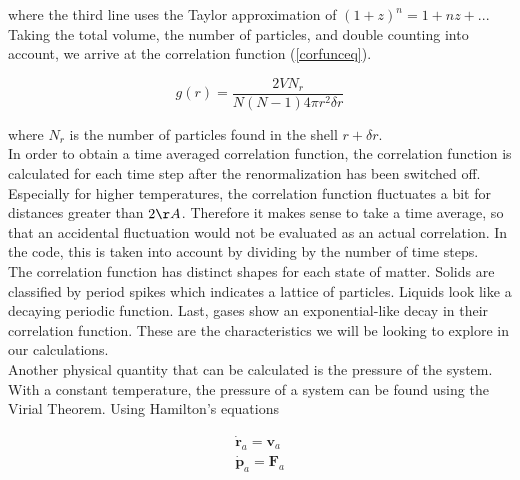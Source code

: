 \documentclass{article}
\begin{document}
\begin{multicols}{2}
\noindent where the third line uses the Taylor approximation of $(1+z)^n = 1 + nz+ ...$  Taking the total volume, the number of particles, and double counting into account, we arrive at the correlation function (\ref{corfunceq}). 

\begin{equation}
g(r) = \frac{2VN_r}{N(N-1)4 \pi r^2 \delta r}
\label{corfunceq}
\end{equation}

\noindent where $N_r$ is the number of particles found in the shell $r + \delta r$.  \\

In order to obtain a time averaged correlation function, the correlation function is calculated for each time step after the renormalization has been switched off. Especially for higher temperatures, the correlation function fluctuates a bit for distances greater than $2\AA$. Therefore it makes sense to take a time average, so that an accidental fluctuation would not be evaluated as an actual correlation. In the code, this is taken into account by dividing by the number of time steps. \\

The correlation function has distinct shapes for each state of matter.  Solids are classified by period spikes which indicates a lattice of particles.  Liquids look like a decaying periodic function.  Last, gases show an exponential-like decay in their correlation function.  These are the characteristics we will be looking to explore in our calculations. \\



Another physical quantity that can be calculated is the pressure of the system.  With a constant temperature, the pressure of a system can be found using the Virial Theorem.  Using Hamilton's equations

\begin{equation}
\begin{split}
\dot{\textbf{r}}_a = \textbf{v}_a \\
\dot{\textbf{p}}_a = \textbf{F}_a 
\end{split}
\end{equation}


\end{multicols}
\end{document}
